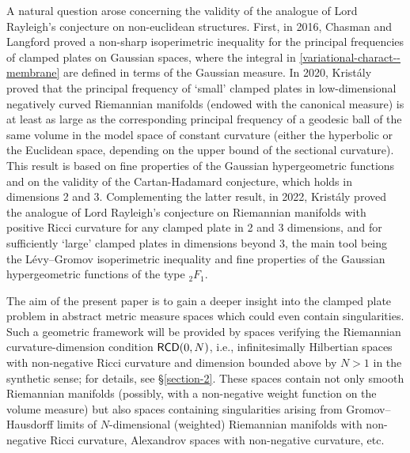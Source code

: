 \documentclass[11pt, reqno]{amsart}
\numberwithin{equation}{section}
\begin{document}
	A natural question arose concerning the validity of the analogue of Lord Rayleigh's conjecture on non-euclidean structures. First, in 2016, Chasman and Langford \cite{Chasman-Langford} proved a
	non-sharp isoperimetric inequality for the principal frequencies of clamped plates on Gaussian spaces, where the integral in \eqref{variational-charact--membrane} are defined in terms of the Gaussian measure. In 2020, Krist\'aly \cite{Kristaly-Adv} proved that the principal frequency of  `small' clamped plates in low-dimensional negatively curved Riemannian manifolds (endowed with the canonical measure) is at least as large as the corresponding principal frequency of a geodesic ball of the same volume in the model space of constant curvature (either the hyperbolic or the Euclidean space, depending on the upper bound of the sectional curvature). This result is based on fine properties of the Gaussian hypergeometric functions and on the validity of the Cartan-Hadamard conjecture, which holds in dimensions 2 and 3. Complementing the latter result, in 2022, Krist\'aly \cite{Kristaly-GAFA} proved the analogue of Lord Rayleigh's conjecture 
	on 	Riemannian manifolds with positive Ricci curvature for any clamped plate in 2
	and 3 dimensions, and for sufficiently `large' clamped plates in dimensions beyond
	3, the main tool being the L\'evy--Gromov isoperimetric inequality and fine properties of the Gaussian hypergeometric functions of the type $_2F_1$.  
 
	

	The aim of the present paper is to gain a deeper insight into the clamped plate  problem in abstract metric measure spaces which could  even contain singularities. Such a geometric framework will be provided by spaces verifying the Riemannian curvature-dimension condition ${\sf RCD}(0,N)$, i.e.,  infinitesimally Hilbertian spaces with non-negative Ricci curvature  and dimension bounded above by $N>1$ in the synthetic sense; for details, see \S \ref{section-2}. These spaces contain not only smooth Riemannian manifolds (possibly, with a non-negative weight function on the volume measure) but also spaces containing singularities arising from Gromov--Hausdorff limits of $N$-dimensional (weighted) Riemannian manifolds with non-negative Ricci curvature, Alexandrov spaces with non-negative curvature, etc. 
	
	
		
	
	
\end{document}
